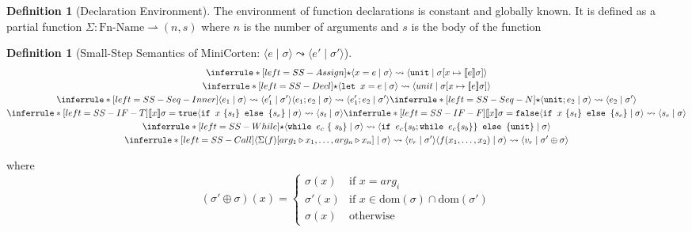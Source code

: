\documentclass[twoside, english]{sdqthesis}
\newcommand{\tuple}[2]{\langle #1 \mid #2 \rangle}
\newcommand{\bbracket}[1]{\llbracket #1 \rrbracket}
\theoremstyle{definition}
\newtheorem{definition}[theorem]{Definition}
\begin{document}
\begin{definition}[Declaration Environment]
  The environment of function declarations is constant and globally known. It is defined as a partial function $\Sigma : \text{Fn-Name} \rightharpoonup (n, s)$ where $n$ is the number of arguments and $s$ is the body of the function
\end{definition}

\begin{definition}[Small-Step Semantics of MiniCorten: $\tuple{e}{\sigma} \leadsto \tuple{e'}{\sigma'}$]

\begin{gather*}
  \inferrule*[left=SS-Assign]
    {\star}
    {\tuple{x = e }{ \sigma } \leadsto \tuple{\code{unit} }{ \sigma[x \mapsto \bbracket{e}\sigma]}}
  \\
  \inferrule*[left=SS-Decl]
    {\star}
    {\tuple{\code{let } x = e}{\sigma} \leadsto \tuple{unit}{\sigma[ x \mapsto \bbracket{e}\sigma]}}
  \\
  \inferrule*[left=SS-Seq-Inner]
      {\tuple{e_1 }{ \sigma } \leadsto \tuple{e_1' }{ \sigma'}}
      {\tuple{e_1; e_2 }{ \sigma } \leadsto \tuple{e_1'; e_2 }{ \sigma'}}
  \inferrule*[left=SS-Seq-N]
    {\star}
    {\tuple{\code{unit}; e_2 }{ \sigma } \leadsto \tuple{e_2 }{ \sigma'}}
  \\
  \inferrule*[left=SS-IF-T]
    {\bbracket{x} \sigma = \code{true}}
    {\tuple{\code{if } x\ \{ s_t \} \code { else } \{ s_e \} }{\sigma} \leadsto \tuple{s_t}{\sigma}}
  \inferrule*[left=SS-IF-F]
    {\bbracket{x}\sigma = \code{false}}
    {\tuple{\code{if } x\ \{ s_t \} \code { else } \{ s_e \} }{\sigma} \leadsto \tuple{s_e}{\sigma}}
  \\
  \inferrule*[left=SS-While]
    {\star}
    {
      \tuple{ \code{while } e_c\ \{\ s_b \}}{\sigma}
      \leadsto
      \tuple{ \code{if } e_c \{ s_b;  \code{while } e_c \{ s_b \} \} { \code{ else } } \{ \code{unit} \} }{\sigma}
    }
  \\
  \inferrule*[left=SS-Call]
    {\tuple{\Sigma(f)[arg_1 \triangleright x_1, \dots, arg_n \triangleright x_n]}{\sigma} \leadsto \tuple{v_r}{\sigma'} }
    {\tuple{f(x_1, \dots, x_2)}{\sigma} \leadsto \tuple{v_r}{\sigma' \oplus \sigma}}
\end{gather*}

where $$(\sigma' \oplus \sigma)(x) =
  \begin{cases}
    \sigma(x) & \text{if } x = arg_i \\
    \sigma'(x) & \text{if } x \in \text{dom}(\sigma) \cap \text{dom}(\sigma')\\
    \sigma(x) & \text{otherwise }
  \end{cases}$$
\end{definition}
\end{document}
